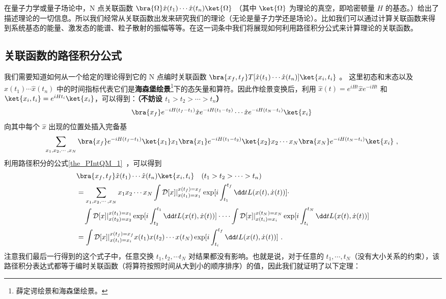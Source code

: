 
在量子力学或量子场论中，N 点关联函数 $\bra{\Omega}\hat x(t_1)\cdots \hat x(t_n)\ket{\Omega}$ （其中 $\ket{\Omega}$ 为理论的真空，即哈密顿量 $H$ 的基态。）给出了描述理论的一切信息。所以我们经常从关联函数出发来研究我们的理论（无论是量子力学还是场论）。比如我们可以通过计算关联函数来得到系统基态的能量、激发态的能谱、粒子散射的振幅等等。在这一词条中我们将展现如何利用路径积分公式来计算理论的关联函数。
\subsection{关联函数的路径积分公式}
我们需要知道如何从一个给定的理论得到它的 N 点编时关联函数
 $\bra{x_f,t_f} T[\hat x(t_1)\cdots \hat x(t_n)]\ket{x_i,t_i}$ 。
这里初态和末态以及 $\hat x(t_1)\cdots \hat x(t_n)$ 中的时间指标代表它们是\textbf{海森堡绘景}\footnote{薛定谔绘景和海森堡绘景。}下的态矢量和算符。因此作绘景变换后，利用 $\hat x(t)=e^{iHt}\hat x e^{-iHt}$ 和 $\ket{x_i,t_i}=e^{iHt_i} \ket{x_i}$，可以得到：\textbf{（不妨设 $t_1>t_2>\cdots >t_n$）}
\begin{equation}
\begin{aligned}
\bra{x_f} e^{-iH (t_f-t_1)} \hat x e^{-iH(t_1-t_2)}\cdots \hat x e^{-iH(t_N-t_i)}\ket{x_i}
\end{aligned}~
\end{equation}
向其中每个 $\hat x$ 出现的位置处插入完备基
\begin{equation}
\begin{aligned}
\sum_{x_1,x_2,\cdots,x_N}\bra{x_f} e^{-iH (t_f-t_1)} \ket{x_{1}}x_1\bra{x_1} e^{-iH(t_1-t_2)}\ket{x_2}x_2\cdots x_N \bra{x_N} e^{-iH(t_N-t_i)}\ket{x_i}~,
\end{aligned}~
\end{equation}
利用路径积分的公式\autoref{the_PIntQM_1}~，可以得到
\begin{equation}
\begin{aligned}
&\bra{x_f,t_f} \hat x(t_1)\cdots \hat x(t_n)\ket{x_i,t_i}\quad (t_1>t_2>\cdots >t_n)\\
&=\sum_{x_1,x_2,\cdots,x_N}x_1x_2\cdots x_N
\int \mathcal{D}[x]|_{x(t_1)=x_1}^{x(t_f)=x_f} \exp[i\int_{t_1}^{t_f} \dd t L(x(t),\dot x(t))] \cdot \\
&\quad \int \mathcal{D}[x]|_{x(t_2)=x_2}^{x(t_1)=x_1}
\exp[i\int_{t_2}^{t_1} \dd t L(x(t),\dot x(t))]
\cdot \cdots 
\int \mathcal{D}[x]|_{x(t_i)=x_i}^{x(t_N)=x_N} 
\exp[i\int_{t_i}^{t_N} \dd t L(x(t),\dot x(t))]\\
&=\int \mathcal{D}[x]|_{x(t_i)=x_i}^{x(t_f)=x_f} x(t_1)x(t_2)\cdots x(t_N) \exp[i\int_{t_i}^{t_f} \dd t L(x(t),\dot x(t))]~.
\end{aligned}
\end{equation}
注意我们最后一行得到的这个式子中，任意交换 $t_1,t_2,\cdots t_N$ 对结果都没有影响。也就是说，对于任意的 $t_1,\cdots,t_N$（没有大小关系的约束），该路径积分表达式都等于编时关联函数（将算符按照时间从大到小的顺序排序）的值，因此我们就证明了以下定理：

